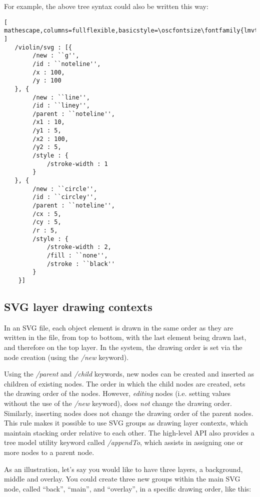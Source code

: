 \begin{minipage}{\linewidth}
For example, the above tree syntax could also be written this way:

\begin{lstlisting}[ mathescape,columns=fullflexible,basicstyle=\oscfontsize\fontfamily{lmvtt}\selectfont ]
   /violin/svg : [{
        /new : ``g'',
        /id : ``noteline'',
        /x : 100,
        /y : 100
   }, {
        /new : ``line'',
        /id : ``liney'',
        /parent : ``noteline'',
        /x1 : 10,
        /y1 : 5,
        /x2 : 100,
        /y2 : 5,
        /style : {
            /stroke-width : 1
      	}
   }, {
        /new : ``circle'',
        /id : ``circley'',
        /parent : ``noteline'',
        /cx : 5,
        /cy : 5,
        /r : 5,
        /style : {
            /stroke-width : 2,
            /fill : ``none'',
            /stroke : ``black''
        }
    }]
\end{lstlisting}
\end{minipage}


\subsection{SVG layer drawing contexts}\label{sec:contexts}
In an SVG file, each object element is drawn in the same order as they are written in the file, from top to bottom, with the last element being drawn last, and therefore on the top layer.
In the \drawsocket system, the drawing order is set via the node creation (using the \textit{/new} keyword).

Using the \textit{/parent} and \textit{/child} keywords, new nodes can be created and inserted as children of existing nodes.
The order in which the child nodes are created, sets the drawing order of the nodes.
However, \textit{editing} nodes (i.e. setting values without the use of the \textit{/new} keyword), does \textit{not} change the drawing order.
Similarly, inserting nodes does not change the drawing order of the parent nodes.
This rule makes it possible to use SVG groups as drawing layer contexts, which maintain stacking order relative to each other.
The high-level API also provides a tree model utility keyword called \textit{/appendTo}, which assists in assigning one or more nodes to a parent node.

As an illustration, let's say you would like to have three layers, a background, middle and overlay. 
You could create three new groups within the main SVG node, called ``back'', ``main'', and ``overlay'', in a specific drawing order, like this:


